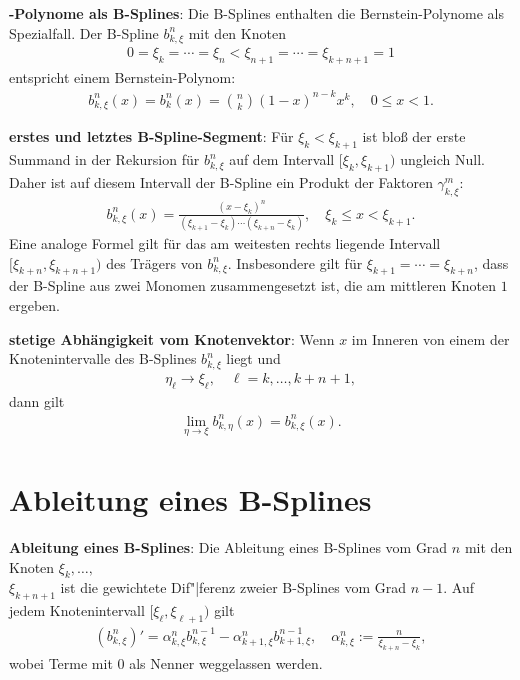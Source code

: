 \linie

\textbf{-Polynome als B-Splines}:
Die B-Splines enthalten die Bernstein-Polynome als Spezialfall.
Der B-Spline $b_{k,\xi}^n$ mit den Knoten
\begin{align*}
    0 = \xi_k = \dotsb = \xi_n < \xi_{n+1} = \dotsb = \xi_{k+n+1} = 1
\end{align*}
entspricht einem Bernstein-Polynom:
\begin{align*}
    b_{k,\xi}^n(x) = b_k^n(x) = \binom{n}{k} (1 - x)^{n - k} x^k,\quad 0 \le x < 1.
\end{align*}

\linie

\textbf{erstes und letztes B-Spline-Segment}:
Für $\xi_k < \xi_{k+1}$ ist bloß der erste Summand in der Rekursion für $b_{k,\xi}^n$
auf dem Intervall $[\xi_k, \xi_{k+1})$ ungleich Null.
Daher ist auf diesem Intervall der B-Spline ein Produkt der Faktoren $\gamma_{k,\xi}^m$:
\begin{align*}
    b_{k,\xi}^n(x) = \frac{(x - \xi_k)^n}{(\xi_{k+1} - \xi_k) \dotsm (\xi_{k+n} - \xi_k)},\quad
    \xi_k \le x < \xi_{k+1}.
\end{align*}
Eine analoge Formel gilt für das am weitesten rechts liegende Intervall $[\xi_{k+n}, \xi_{k+n+1})$
des Trägers von $b_{k,\xi}^n$.
Insbesondere gilt für $\xi_{k+1} = \dotsb = \xi_{k+n}$, dass der B-Spline aus zwei Monomen
zusammengesetzt ist, die am mittleren Knoten $1$ ergeben.

\linie

\textbf{stetige Abhängigkeit vom Knotenvektor}:
Wenn $x$ im Inneren von einem der Knotenintervalle des B-Splines $b_{k,\xi}^n$ liegt und
\begin{align*}
    \eta_\ell \to \xi_\ell,\quad \ell = k, \dotsc, k + n + 1,
\end{align*}
dann gilt
\begin{align*}
    \lim_{\eta \to \xi} b_{k,\eta}^n(x) = b_{k,\xi}^n(x).
\end{align*}

\section{%
    Ableitung eines B-Splines%
}

\textbf{Ableitung eines B-Splines}:
Die Ableitung eines B-Splines vom Grad $n$ mit den Knoten $\xi_k, \dotsc,$\\
$\xi_{k+n+1}$ ist die gewichtete Dif"|ferenz zweier B-Splines vom Grad $n - 1$.
Auf jedem Knotenintervall $[\xi_\ell, \xi_{\ell+1})$ gilt
\begin{align*}
    (b_{k,\xi}^n)' = \alpha_{k,\xi}^n b_{k,\xi}^{n-1} - \alpha_{k+1,\xi}^n b_{k+1,\xi}^{n-1},\quad
    \alpha_{k,\xi}^n := \frac{n}{\xi_{k+n} - \xi_k},
\end{align*}
wobei Terme mit $0$ als Nenner weggelassen werden.

